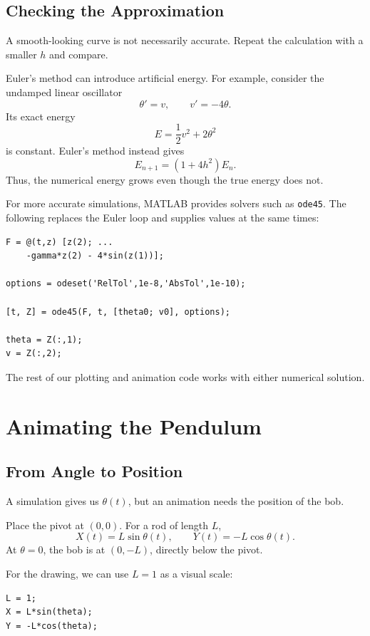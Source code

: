 \documentclass[10pt,letterpaper]{article}
\begin{document}
\subsection{Checking the Approximation}

A smooth-looking curve is not necessarily accurate.
Repeat the calculation with a smaller $h$ and compare.

Euler's method can introduce artificial energy.
For example, consider the undamped linear oscillator
\[
\theta'=v,\qquad v'=-4\theta.
\]
Its exact energy
\[
E=\frac12v^2+2\theta^2
\]
is constant. Euler's method instead gives
\[
E_{n+1}=(1+4h^2)E_n.
\]
Thus, the numerical energy grows even though
the true energy does not.

For more accurate simulations, MATLAB provides
solvers such as \texttt{ode45}. The following replaces
the Euler loop and supplies values at the same times:

\begin{lstlisting}[style=lecturematlab]
F = @(t,z) [z(2); ...
    -gamma*z(2) - 4*sin(z(1))];

options = odeset('RelTol',1e-8,'AbsTol',1e-10);

[t, Z] = ode45(F, t, [theta0; v0], options);

theta = Z(:,1);
v = Z(:,2);
\end{lstlisting}

The rest of our plotting and animation code works
with either numerical solution.

\section{Animating the Pendulum}

\subsection{From Angle to Position}

A simulation gives us $\theta(t)$, but an animation
needs the position of the bob.

Place the pivot at $(0,0)$. For a rod of length $L$,
\[
\boxed{
X(t)=L\sin\theta(t),
\qquad
Y(t)=-L\cos\theta(t).
}
\]
At $\theta=0$, the bob is at $(0,-L)$,
directly below the pivot.

For the drawing, we can use $L=1$ as a visual scale:

\begin{lstlisting}[style=lecturematlab]
L = 1;
X = L*sin(theta);
Y = -L*cos(theta);
\end{lstlisting}
\end{document}
